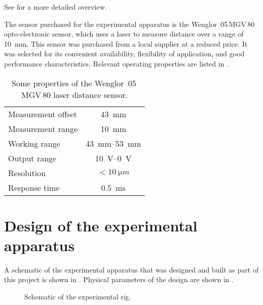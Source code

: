 See \textcite{boehm1993} for a more detailed overview.

The sensor purchased for the experimental apparatus is the Wenglor~05\,MGV\,80
opto-electronic sensor, which uses a laser to measure distance over a
range of \SI{10}{mm}. This sensor was purchased from a local supplier at a reduced
price. It was selected for its convenient availability, flexibility of application,
and good performance characteristics. Relevant operating properties are listed in .

\begin{table}
  \caption{Some properties of the Wenglor~05\,MGV\,80 laser distance sensor.}
  \begin{tabular}{@{}lc@{}}
    \toprule
    Measurement offset & \SI{43}{mm} \\
    Measurement range & \SI{10}{mm} \\
    \midrule
    Working range & \SI{43}{mm}--\SI{53}{mm} \\
    Output range & \SI{10}{V}--\SI{0}{V} \\
    \midrule
    Resolution & $<\SI{10}{\micro m}$ \\
    Response time & \SI{0.5}{ms} \\
    \bottomrule
  \end{tabular}
\end{table}

\section{Design of the experimental apparatus}

A schematic of the experimental apparatus that was designed and built as part of
this project is shown in . Physical parameters of the design
are shown in .

\begin{figure}
  \caption{Schematic of the experimental rig.}
\end{figure}


